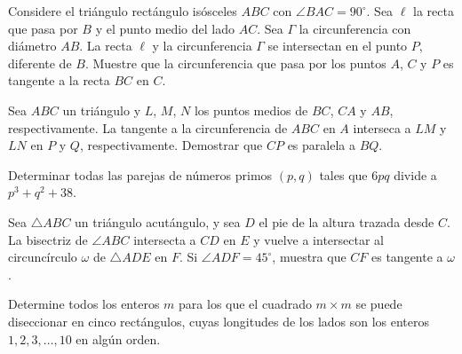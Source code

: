 \documentclass[11pt]{scrartcl}
\begin{document}
\begin{problemax} %
    
    Considere el triángulo rectángulo isósceles $ABC$ con $\angle BAC = 90^{\circ}$. Sea $\ell$ la recta que pasa por $B$ y el punto medio del lado $AC$. Sea $\Gamma$ la circunferencia con diámetro $AB$. La recta $\ell$ y la circunferencia $\Gamma$ se intersectan en el punto $P$, diferente de $B$. Muestre que la circunferencia que pasa por los puntos $A$, $C$ y $P$ es tangente a la recta $BC$ en $C$.
    
\end{problemax}

\begin{problemax} %
    
    Sea $ABC$ un triángulo y $L$, $M$, $N$ los puntos medios de $BC$, $CA$ y $AB$, respectivamente. La tangente a la circunferencia de $ABC$ en $A$ interseca a $LM$ y $LN$ en $P$ y $Q$, respectivamente. Demostrar que $CP$ es paralela a $BQ$.

    
\end{problemax}


\begin{problemax} %
    
    Determinar todas las parejas de números primos $(p, q)$ tales que $6pq$ divide a $p^3 + q^2 + 38.$
    
\end{problemax}

\problemtags{}

\begin{problemax} %
    
    Sea $\bigtriangleup ABC$ un triángulo acutángulo, y sea $D$ el pie de la altura trazada desde $C$. La
bisectriz de $\angle ABC$ intersecta a $CD$ en $E$ y vuelve a intersectar al circuncírculo $\omega$ de $\bigtriangleup ADE$ en $F$. Si
$\angle ADF = 45^{\circ}$, muestra que $CF$ es tangente a $\omega$.
    
\end{problemax} 

\begin{problemax}%
    

    Determine todos los enteros $m$ para los que el cuadrado $m \times m$ se puede diseccionar en cinco rectángulos, cuyas longitudes de los lados son los enteros $1,2,3,\ldots,10$ en algún orden.
\end{problemax}
\end{document}
